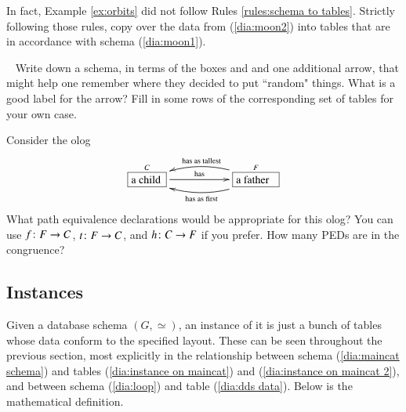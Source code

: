 \begin{exercise}
In fact, Example \ref{ex:orbits} did not follow Rules \ref{rules:schema to tables}. Strictly following those rules, copy over the data from (\ref{dia:moon2}) into tables that are in accordance with schema (\ref{dia:moon1}).
\end{exercise}

\begin{exercise}~
\sexc Write down a schema, in terms of the boxes  and  and one additional arrow, that might help one remember where they decided to put ``random" things. 
\next What is a good label for the arrow? 
\next Fill in some rows of the corresponding set of tables for your own case.
\endsexc
\end{exercise}

\begin{exercise}\label{exc:father and child}
Consider the olog 
$$
\xymatrix{\obox{C}{.4in}{a child}\LA{rr}{has}&&\obox{F}{.5in}{a father}\ar@/^1pc/[ll]^{\tn{has as first}}\ar@/_1pc/[ll]_{\tn{has as tallest}}}
$$
\sexc What path equivalence declarations would be appropriate for this olog? You can use $f\colon F\rightarrow C$, $t\colon F\rightarrow C$, and $h\colon C\rightarrow F$ if you prefer. 
\next How many PEDs are in the congruence?
\endsexc
\end{exercise}


\subsection{Instances}

Given a database schema $(G,\simeq)$, an instance of it is just a bunch of tables whose data conform to the specified layout. These can be seen throughout the previous section, most explicitly in the relationship between schema (\ref{dia:maincat schema}) and tables (\ref{dia:instance on maincat}) and (\ref{dia:instance on maincat 2}), and between schema (\ref{dia:loop}) and table (\ref{dia:dds data}). Below is the mathematical definition.

